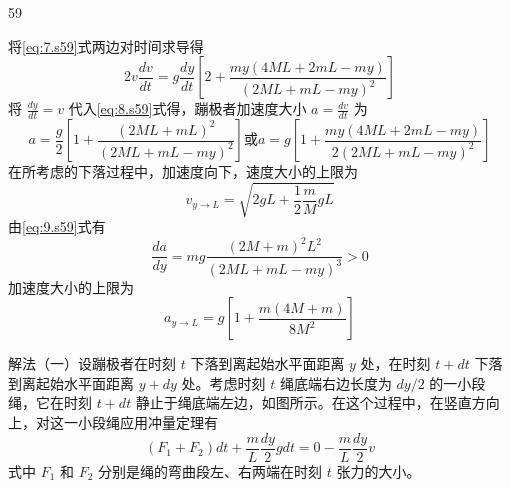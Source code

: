 \begin{solution}{59}
\begin{subsolution}
\begin{equation}
            \label{eq:7.s59}
        \end{equation}
        将\eqref{eq:7.s59}式两边对时间求导得
        \begin{equation}
            2 v \frac {d v}{d t} = g \frac {d y}{d t} \left[ 2 + \frac {m y (4 M L + 2 m L - m y)}{(2 M L + m L - m y)^{2}} \right]
            \label{eq:8.s59}
        \end{equation}
        将 $\frac{dy}{dt} = v$ 代入\eqref{eq:8.s59}式得，蹦极者加速度大小 $a = \frac{dv}{dt}$ 为
        \begin{equation}
            a = \frac {g}{2} \left[ 1 + \frac {(2 M L + m L)^{2}}{(2 M L + m L - m y)^{2}} \right] \text{或} a = g \left[ 1 + \frac {m y (4 M L + 2 m L - m y)}{2 (2 M L + m L - m y)^{2}} \right]
            \label{eq:9.s59}
        \end{equation}
        在所考虑的下落过程中，加速度向下，速度大小的上限为
        \begin{equation}
            v _ {y \rightarrow L} = \sqrt {2 g L + \frac {1}{2} \frac {m}{M} g L}
            \label{eq:10.s59}
        \end{equation}
        由\eqref{eq:9.s59}式有
        \begin{equation}
            \frac {d a}{d y} = m g \frac {(2 M + m)^{2} L^{2}}{(2 M L + m L - m y)^{3}} > 0
            \label{eq:11.s59}
        \end{equation}
        加速度大小的上限为
        \begin{equation}
            a _ {y \rightarrow L} = g \left[ 1 + \frac {m (4 M + m)}{8 M^{2}} \right]
            \label{eq:12.s59}
        \end{equation}
    \end{subsolution}
    \begin{subsolution}
        解法（一）设蹦极者在时刻 $t$ 下落到离起始水平面距离 $y$ 处，在时刻 $t + dt$ 下落到离起始水平面距离 $y + dy$ 处。考虑时刻 $t$ 绳底端右边长度为 $dy / 2$ 的一小段绳，它在时刻 $t + dt$ 静止于绳底端左边，如图所示。在这个过程中，在竖直方向上，对这一小段绳应用冲量定理有
        \begin{equation}
            \left(F _ {1} + F _ {2}\right) d t + \frac {m}{L} \frac {d y}{2} g d t = 0 - \frac {m}{L} \frac {d y}{2} v
            \label{eq:13.s59}
        \end{equation}
        式中 $F_{1}$ 和 $F_{2}$ 分别是绳的弯曲段左、右两端在时刻 $t$ 张力的大小。


\end{subsolution}
\end{solution}
